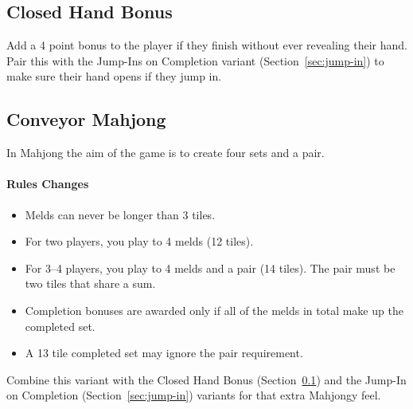 \subsection{Closed Hand Bonus}\label{sec:closed-hand}
Add a 4 point bonus to the player if they finish without ever revealing their hand.
Pair this with the Jump-Ins on Completion variant (Section~\ref{sec:jump-in}) to make sure their hand opens if they jump in.

\subsection{Conveyor Mahjong}
In Mahjong the aim of the game is to create four sets and a pair.

\paragraph{Rules Changes}

\begin{itemize}
    \item Melds can never be longer than 3 tiles.
    \item For two players, you play to 4 melds (12 tiles).
    \item For 3--4 players, you play to 4 melds and a pair (14 tiles). The pair must be two tiles that share a sum.
    \item Completion bonuses are awarded only if all of the melds in total make up the completed set. 
    \item A 13 tile completed set may ignore the pair requirement.
\end{itemize}

Combine this variant with the Closed Hand Bonus (Section~\ref{sec:closed-hand}) and the Jump-In on Completion (Section~\ref{sec:jump-in}) variants for that extra Mahjongy feel.